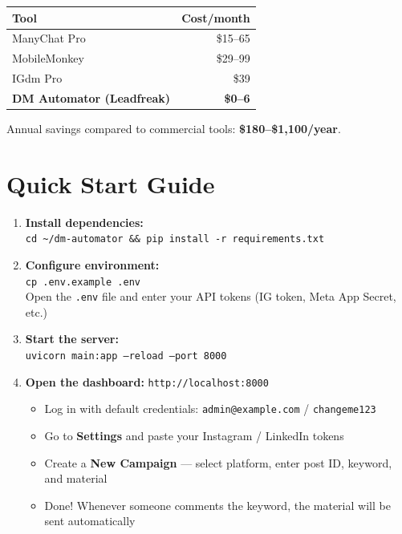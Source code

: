 \documentclass[12pt,a4paper]{article}
\begin{document}
\begin{tabularx}{\textwidth}{Xr}
\toprule
\textbf{Tool} & \textbf{Cost/month} \\
\midrule
ManyChat Pro & \$15--65 \\
MobileMonkey & \$29--99 \\
IGdm Pro & \$39 \\
\textbf{DM Automator (Leadfreak)} & \textbf{\$0--6} \\
\bottomrule
\end{tabularx}

\vspace{0.5em}
Annual savings compared to commercial tools: \textbf{\$180--\$1,100/year}.

\newpage
\section{Quick Start Guide}

\begin{enumerate}[leftmargin=1.5em, itemsep=0.6em]
    \item \textbf{Install dependencies:}\\
    \texttt{cd \textasciitilde/dm-automator \&\& pip install -r requirements.txt}

    \item \textbf{Configure environment:}\\
    \texttt{cp .env.example .env}\\
    Open the \texttt{.env} file and enter your API tokens (IG token, Meta App Secret, etc.)

    \item \textbf{Start the server:}\\
    \texttt{uvicorn main:app --reload --port 8000}

    \item \textbf{Open the dashboard:} \texttt{http://localhost:8000}
    \begin{itemize}[itemsep=0.2em]
        \item Log in with default credentials: \texttt{admin@example.com} / \texttt{changeme123}
        \item Go to \textbf{Settings} and paste your Instagram / LinkedIn tokens
        \item Create a \textbf{New Campaign} --- select platform, enter post ID, keyword, and material
        \item Done! Whenever someone comments the keyword, the material will be sent automatically
    \end{itemize}
\end{enumerate}
\end{document}
